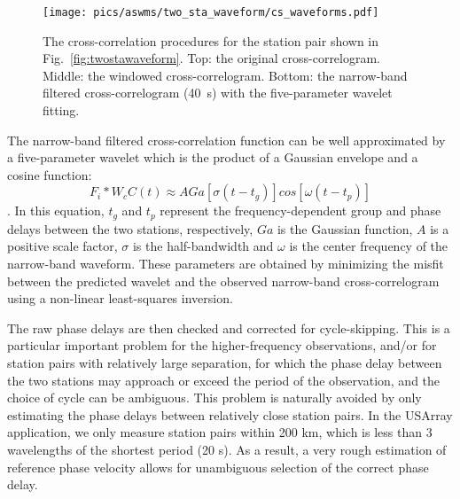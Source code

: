 \begin{figure}
	\center
	\texttt{[image: pics/aswms/two\_sta\_waveform/cs\_waveforms.pdf]}
	\caption{The cross-correlation procedures for the station pair shown in Fig.~\ref{fig:twostawaveform}. Top: the original cross-correlogram. Middle: the windowed cross-correlogram. Bottom: the narrow-band filtered cross-correlogram (40~s) with the five-parameter wavelet fitting. }
	\label{fig:cswaveform}
\end{figure}


The narrow-band filtered cross-correlation function can be well approximated by a five-parameter wavelet which is the product of a Gaussian envelope and a cosine function:
\begin{equation}
	F_i \ast W_c C(t) \approx A Ga [\sigma(t-t_g)]cos[\omega(t-t_p)]
\end{equation}
\citep{Gee:1992ww}.  In this equation, $t_g$ and $t_p$ represent the frequency-dependent group and phase delays between the two stations, respectively, $Ga$ is the Gaussian function, $A$ is a positive scale factor, $\sigma$ is the half-bandwidth and $\omega$ is the center frequency of the narrow-band waveform. These parameters are obtained by minimizing the misfit between the predicted wavelet and the observed narrow-band cross-correlogram using a non-linear least-squares inversion.

The raw phase delays are then checked and corrected for cycle-skipping.  This is a particular important problem for the higher-frequency observations, and/or for station pairs with relatively large separation, for which the phase delay between the two stations may approach or exceed the period of the observation, and the choice of cycle can be ambiguous. This problem is naturally avoided by only estimating the phase delays between relatively close station pairs. In the USArray application, we only measure station pairs within 200 km, which is less than 3 wavelengths of the shortest period (20 s). As a result, a very rough estimation of reference phase velocity allows for unambiguous selection of the correct phase delay. 

